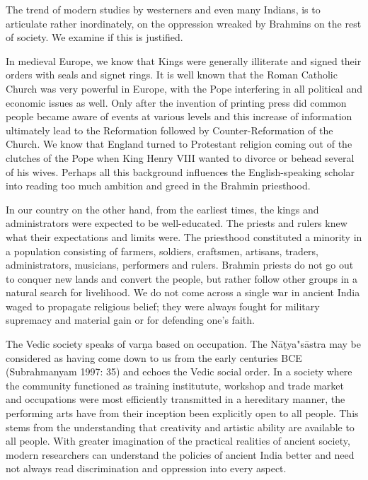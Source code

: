 The trend of modern studies by westerners and even many Indians, is to articulate rather inordinately, on the oppression wreaked by Brahmins on the rest of society. We examine if this is justified.

\vskip 2pt

In medieval Europe, we know that Kings were generally illiterate and signed their orders with seals and signet rings. It is well known that the Roman Catholic Church was very powerful in Europe, with the Pope interfering in all political and economic issues as well. Only after the invention of printing press did common people became aware of events at various levels and this increase of information ultimately lead to the Reformation followed by Counter-Reformation of the Church. We know that England turned to Protestant religion coming out of the clutches of the Pope when King Henry VIII wanted to divorce or behead several of his wives. Perhaps all this background influences the English-speaking scholar into reading too much ambition and greed in the Brahmin priesthood.

\vskip 2pt

In our country on the other hand, from the earliest times, the kings and administrators were expected to be well-educated. The priests and rulers knew what their expectations and limits were. The priesthood constituted a minority in a population consisting of farmers, soldiers, craftsmen, artisans, traders, administrators, musicians, performers and rulers. Brahmin priests do not go out to conquer new lands and convert the people, but rather follow other groups in a natural search for livelihood. We do not come across a single war in ancient India waged to propagate religious belief; they were always fought for military supremacy and material gain or for defending one’s faith.

The Vedic society speaks of varṇa based on occupation. The Nāṭya"sāstra may be considered as having come down to us from the early centuries BCE (Subrahmanyam 1997: 35) and echoes the Vedic social order. In a society where the community functioned as training institutute, workshop and trade market and occupations were most efficiently transmitted in a hereditary manner, the performing arts have from their inception been explicitly open to all people. This stems from the understanding that creativity and artistic ability are available to all people. With greater imagination of the practical realities of ancient society, modern researchers can understand the policies of ancient India better and need not always read discrimination and oppression into every aspect.

